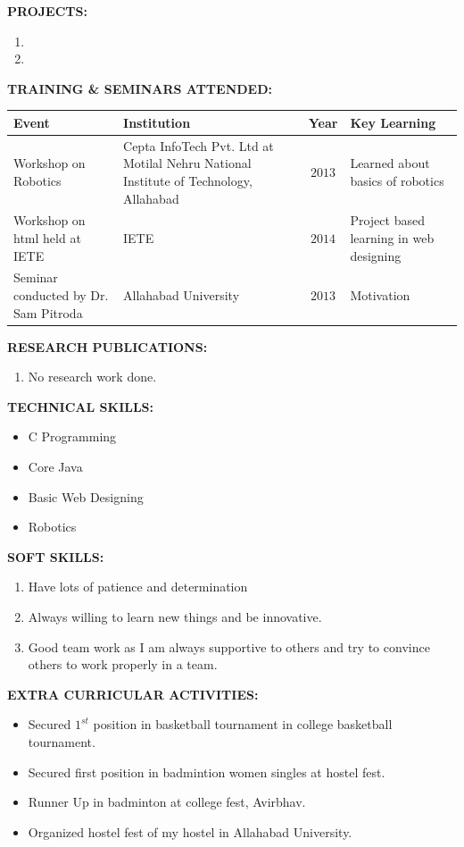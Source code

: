 \documentclass{article}
\begin{document}
\textbf{PROJECTS:}
\begin{enumerate}
	\item
    \item
\end{enumerate}

\textbf{TRAINING \& SEMINARS ATTENDED:}\\
\begin{tabular}{|p{2in}|p{2.5in}|c|p{1.3in}|}
	\hline
	\qquad \qquad \qquad \textbf{Event} & \qquad \qquad \qquad \textbf{Institution} & \textbf{Year} & \qquad \textbf{Key Learning}\\
	\hline
	Workshop on Robotics & Cepta InfoTech Pvt. Ltd at Motilal Nehru National Institute of Technology, Allahabad & $2013$ & Learned about basics of robotics\\
	\hline
	Workshop on html held at IETE & IETE & $2014$ & Project based learning in web designing\\
	\hline
	Seminar conducted by Dr. Sam Pitroda & Allahabad University & $2013$ & Motivation\\
	\hline
\end{tabular} 
\newline 
\newline

\textbf{RESEARCH PUBLICATIONS:}
\begin{enumerate}
	\item No research work done.
\end{enumerate}

\textbf{TECHNICAL SKILLS:}
\begin{itemize}
	\item C Programming
	\item Core Java
	\item Basic Web Designing
	\item Robotics
\end{itemize}
\newpage

\textbf{SOFT SKILLS:}
\begin{enumerate}
	\item Have lots of patience and determination 
	\item Always willing to learn new things and be innovative.
	\item Good team work as I am always supportive to others and try to convince others to work properly in a team.
\end{enumerate}

\textbf{EXTRA CURRICULAR ACTIVITIES:}
\begin{itemize}
	\item Secured $1^{st}$ position in basketball tournament in college basketball tournament.
	\item Secured first position in badmintion women singles at hostel fest.
	\item Runner Up in badminton at college fest, Avirbhav.
	\item Organized hostel fest of my hostel in Allahabad University.
\end{itemize}
\end{document}
